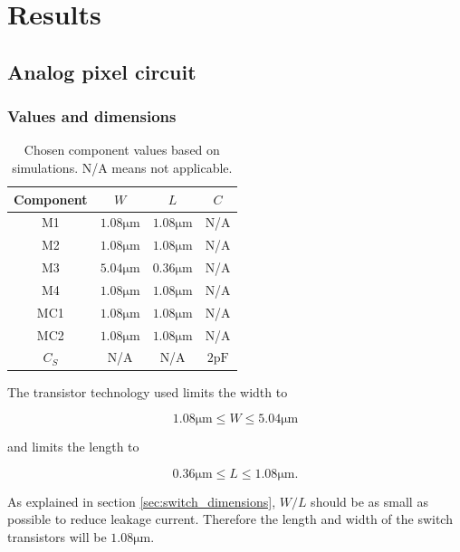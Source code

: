 \section{Results}
\subsection{Analog pixel circuit}
\subsubsection{Values and dimensions}

\begin{table}
    \centering
    \caption{Chosen component values based on simulations. N/A means not applicable.}
    \begin{tabular}{|c|c|c|c|}
        \hline
        Component & $W$ & $L$ & $C$ \\
        \hline
        M1 & $1.08 \mathrm{\mu m}$ & $1.08 \mathrm{\mu m}$ & N/A \\
        \hline
        M2 & $1.08 \mathrm{\mu m}$ & $1.08 \mathrm{\mu m}$ & N/A \\
        \hline
        M3 & $5.04 \mathrm{\mu m}$ & $0.36 \mathrm{\mu m}$ & N/A \\
        \hline
        M4 & $1.08 \mathrm{\mu m}$ & $1.08 \mathrm{\mu m}$ & N/A \\
        \hline
        MC1 & $1.08 \mathrm{\mu m}$ & $1.08 \mathrm{\mu m}$ & N/A \\
        \hline
        MC2 & $1.08 \mathrm{\mu m}$ & $1.08 \mathrm{\mu m}$ & N/A \\
        \hline
        $C_S$ & N/A & N/A & $2 \mathrm{pF}$ \\
        \hline
    \end{tabular}
\end{table}

The transistor technology used limits the width to 

\begin{equation}
    \label{eq:limitsW}
    1.08 \mathrm{\mu m} \leq W \leq 5.04 \mathrm{\mu m}
\end{equation}

and limits the length to

\begin{equation}
    \label{eq:limitsL}
    0.36 \mathrm{\mu m} \leq L \leq 1.08 \mathrm{\mu m}.
\end{equation}

As explained in section \ref{sec:switch_dimensions}, $W/L$ should be as small as possible to reduce leakage current. Therefore the length and width of the switch transistors will be $1.08\mathrm{\mu m}$.

